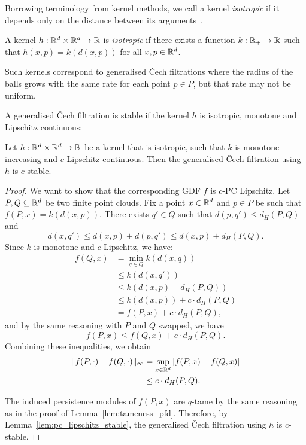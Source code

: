 Borrowing terminology from kernel methods, we call a kernel \emph{isotropic}
if it depends only on the distance between its
arguments~\cite{genton2001classes}.
\begin{definition}
    A kernel $h : \mathbb{R}^d \times \mathbb{R}^d \to \mathbb{R}$ is \emph{isotropic} if there exists a
    function $k : \mathbb{R}_+ \to \mathbb{R}$ such that $h(x, p) = k(d(x, p))$ for all
    $x, p \in \mathbb{R}^d$.
\end{definition}
Such kernels correspond to generalised \v{C}ech filtrations where the radius of
the balls grows with the same rate for each point $p \in P$, but that
rate may not be uniform.

A generalised \v{C}ech filtration is stable if the kernel $h$ is isotropic,
monotone and Lipschitz continuous:
\begin{theorem}
    \label{thm:stable_isotropic}
    Let $h : \mathbb{R}^d \times \mathbb{R}^d \to \mathbb{R}$ be a kernel that is isotropic, such that
    $k$ is monotone increasing and $c$-Lipschitz continuous. Then the
    generalised \v{C}ech filtration using $h$ is $c$-stable.
\end{theorem}
\begin{proof}
    We want to show that the corresponding GDF $f$ is $c$-PC Lipschitz. Let $P,
    Q \subseteq \mathbb{R}^d$ be two finite point clouds. Fix a point $x \in \mathbb{R}^d$ and
    $p \in P$ be such that $f(P, x) = k(d(x, p))$. There exists $q' \in Q$ such
    that $d(p, q') \leq d_H(P, Q)$ and
    \begin{equation}
        d(x, q') \leq d(x, p) + d(p, q') \leq d(x, p) + d_H(P, Q).
    \end{equation}
    Since $k$ is monotone and $c$-Lipschitz, we have:
    \begin{align}
        f(Q, x) & = \min_{q \in Q} k(d(x, q)) \\
        & \leq k(d(x, q')) \\
        & \leq k(d(x, p) + d_H(P, Q)) \\
        & \leq k(d(x, p)) + c \cdot d_H(P, Q) \\
        & = f(P, x) + c \cdot d_H(P, Q),
    \end{align}
    and by the same reasoning with $P$ and $Q$ swapped, we have
    \begin{equation}
        f(P, x) \leq f(Q, x) + c \cdot d_H(P, Q).
    \end{equation}
    Combining these inequalities, we obtain
    \begin{align}
        \lVert f(P, \cdot) - f(Q, \cdot)\rVert_\infty
        & = \sup_{x \in \mathbb{R}^d} |f(P, x) - f(Q, x)| \\
        & \leq c \cdot d_H(P, Q).
    \end{align}

    The induced persistence modules of $f(P, x)$ are $q$-tame by the same
    reasoning as in the proof of Lemma~\ref{lem:tameness_pfd}. Therefore, by
    Lemma~\ref{lem:pc_lipschitz_stable}, the generalised \v{C}ech
    filtration using $h$ is $c$-stable.
\end{proof}

